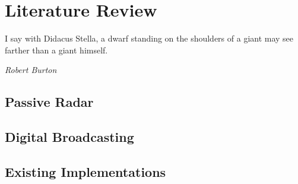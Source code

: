 \documentclass[class=report,11pt,crop=false]{standalone}
\begin{document}
\chapter{Literature Review}
\epigraph{I say with Didacus Stella, a dwarf standing on the shoulders of a giant may see farther than a giant himself.}%
    {\emph{Robert Burton}}

\section{Passive Radar}

\blindmathpaper

\section{Digital Broadcasting}

\blindmathpaper

\section{Existing Implementations}

\blindmathpaper













\ifstandalone

\printnoidxglossary[type=\acronymtype]
\fi
\end{document}
